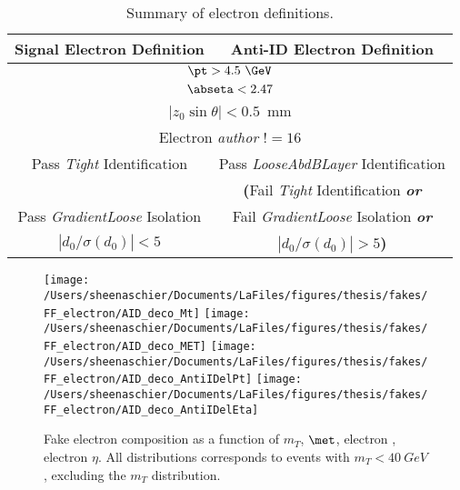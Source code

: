 \begin{table}[!htb]
\begin{center}
\begin{tabular}{c|c}
\hline
Signal Electron Definition  & Anti-ID Electron Definition \\
\hline \hline
\multicolumn{2}{c}{$\pt > 4.5~\GeV$}      \\
\multicolumn{2}{c}{$\abseta < 2.47$ }     \\
\multicolumn{2}{c}{$|z_0\sin\theta| < 0.5$~mm} \\
\multicolumn{2}{c}{Electron \textit{author} $!= 16$}\\
Pass \textit{Tight} Identification & Pass \textit{LooseAbdBLayer} Identification\\
      &             \textbf{(}Fail \textit{Tight} Identification \textbf{\textit{or}} \\
Pass \textit{GradientLoose} Isolation  & Fail \textit{GradientLoose} Isolation \textbf{\textit{or}} \\   
$|d_0/\sigma(d_0)| < 5$  &   $|d_0/\sigma(d_0)| > 5$\textbf{)} \\
\hline
\end{tabular}
\caption{Summary of electron definitions.}
\label{tab:AllElDefs}
\end{center}
\end{table}

\begin{figure}[htb]
        \centering
        \texttt{[image: /Users/sheenaschier/Documents/LaFiles/figures/thesis/fakes/FF\_electron/AID\_deco\_Mt]}
        \texttt{[image: /Users/sheenaschier/Documents/LaFiles/figures/thesis/fakes/FF\_electron/AID\_deco\_MET]}
         \texttt{[image: /Users/sheenaschier/Documents/LaFiles/figures/thesis/fakes/FF\_electron/AID\_deco\_AntiIDelPt]}
        \texttt{[image: /Users/sheenaschier/Documents/LaFiles/figures/thesis/fakes/FF\_electron/AID\_deco\_AntiIDelEta]}
        \caption{Fake electron composition as a function of $m_{T}$, $\met$, electron \pt{}, electron $\eta$. All distributions corresponds to events with $m_{T} < 40~GeV$, excluding the $m_{T}$ distribution. }
        \label{fig:elDeco}
\end{figure}


